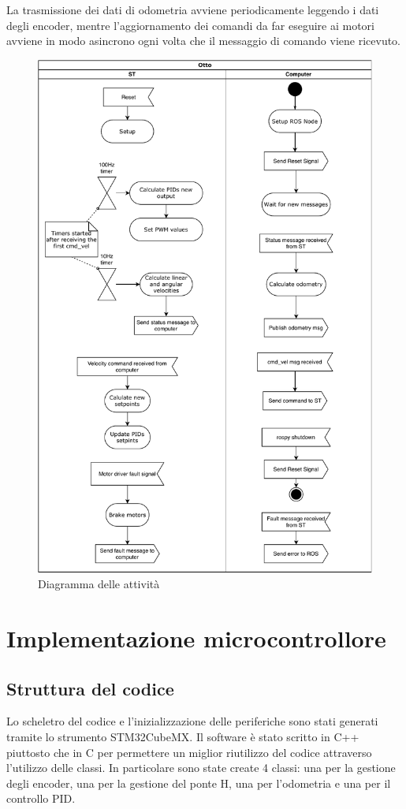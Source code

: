 La trasmissione dei dati di odometria avviene periodicamente leggendo i dati degli encoder, mentre l'aggiornamento dei comandi da far eseguire ai motori avviene in modo asincrono ogni volta che il messaggio di comando viene ricevuto.


\begin{figure}[H]
    \centering
    \includegraphics[scale=0.83]{images/uml_activities.pdf}
    \caption{Diagramma delle attività}
\end{figure}
\newpage

\section{Implementazione microcontrollore}
\subsection{Struttura del codice}
Lo scheletro del codice e l'inizializzazione delle periferiche sono stati generati tramite lo strumento STM32CubeMX. 
Il software è stato scritto in C++ piuttosto che in C per permettere un miglior riutilizzo del codice attraverso l'utilizzo delle classi. In particolare sono state create 4 classi: una per la gestione degli encoder, una per la gestione del ponte H, una per l'odometria e una per il controllo PID.

